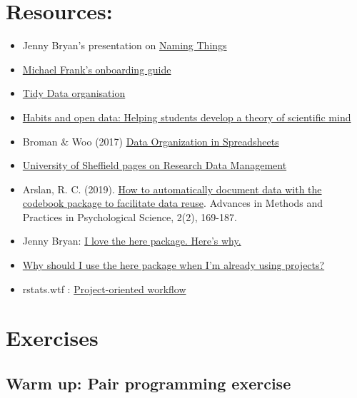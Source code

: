\documentclass[
]{book}
\providecommand{\tightlist}{%
  \setlength{\itemsep}{0pt}\setlength{\parskip}{0pt}}
\begin{document}
\hypertarget{resources-3}{%
\section{Resources:}\label{resources-3}}

\begin{itemize}
\tightlist
\item
  Jenny Bryan's presentation on \href{http://www2.stat.duke.edu/~rcs46/lectures_2015/01-markdown-git/slides/naming-slides/naming-slides.pdf}{Naming Things}
\item
  \href{http://babieslearninglanguage.blogspot.co.uk/2017/01/onboarding.html}{Michael Frank's onboarding guide}
\item
  \href{http://vita.had.co.nz/papers/tidy-data.pdf}{Tidy Data organisation}
\item
  \href{http://bayesfactor.blogspot.co.uk/2015/11/habits-and-open-data-helping-students.html}{Habits and open data: Helping students develop a theory of scientific mind}
\item
  Broman \& Woo (2017) \href{https://www.tandfonline.com/doi/full/10.1080/00031305.2017.1375989}{Data Organization in Spreadsheets}
\item
  \href{https://www.sheffield.ac.uk/library/rdm/index}{University of Sheffield pages on Research Data Management}
\item
  Arslan, R. C. (2019). \href{https://journals.sagepub.com/doi/full/10.1177/2515245919838783}{How to automatically document data with the codebook package to facilitate data reuse}. Advances in Methods and Practices in Psychological Science, 2(2), 169-187.
\item
  Jenny Bryan: \href{https://github.com/jennybc/here_here}{I love the here package. Here's why.}
\item
  \href{https://malco.io/2018/11/05/why-should-i-use-the-here-package-when-i-m-already-using-projects/}{Why should I use the here package when I'm already using projects?}
\item
  rstats.wtf : \href{https://rstats.wtf/project-oriented-workflow.html}{Project-oriented workflow}
\end{itemize}

\hypertarget{exercises-1}{%
\section{Exercises}\label{exercises-1}}

\hypertarget{warm-up-pair-programming-exercise}{%
\subsection{Warm up: Pair programming exercise}\label{warm-up-pair-programming-exercise}}
\end{document}
